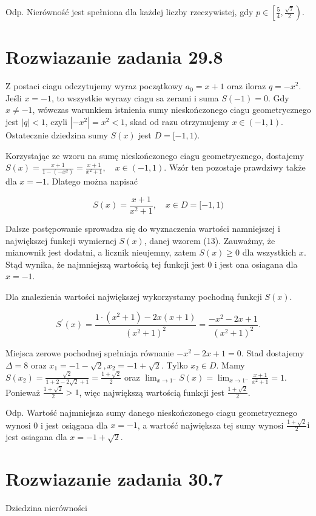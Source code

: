 \documentclass[10pt]{article}
\begin{document}
Odp. Nierówność jest spełniona dla każdej liczby rzeczywistej, gdy $p \in\left[\frac{5}{4}, \frac{\sqrt{7}}{2}\right)$.

\section*{Rozwiazanie zadania 29.8}
Z postaci ciagu odczytujemy wyraz początkowy $a_{0}=x+1$ oraz iloraz $q=-x^{2}$. Jeśli $x=-1$, to wszystkie wyrazy ciagu sa zerami i suma $S(-1)=0$. Gdy $x \neq-1$, wówczas warunkiem istnienia sumy nieskończonego ciagu geometrycznego jest $|q|<1$, czyli $\left|-x^{2}\right|=x^{2}<1$, skad od razu otrzymujemy $x \in(-1,1)$. Ostatecznie dziedzina sumy $S(x)$ jest $D=[-1,1)$.

Korzystając ze wzoru na sumę nieskończonego ciagu geometrycznego, dostajemy $S(x)=\frac{x+1}{1-\left(-x^{2}\right)}=\frac{x+1}{x^{2}+1}, \quad x \in(-1,1)$. Wzór ten pozostaje prawdziwy także dla $x=-1$. Dlatego można napisać

$$
S(x)=\frac{x+1}{x^{2}+1}, \quad x \in D=[-1,1)
$$

Dalsze postępowanie sprowadza się do wyznaczenia wartości namniejszej i największej funkcji wymiernej $S(x)$, danej wzorem (13). Zauważmy, że mianownik jest dodatni, a licznik nieujemny, zatem $S(x) \geq 0$ dla wszystkich $x$. Stąd wynika, że najmniejszą wartością tej funkcji jest 0 i jest ona osiagana dla $x=-1$.

Dla znalezienia wartości największej wykorzystamy pochodną funkcji $S(x)$.

$$
S^{\prime}(x)=\frac{1 \cdot\left(x^{2}+1\right)-2 x(x+1)}{\left(x^{2}+1\right)^{2}}=\frac{-x^{2}-2 x+1}{\left(x^{2}+1\right)^{2}} .
$$

Miejsca zerowe pochodnej spełniaja równanie $-x^{2}-2 x+1=0$. Stad dostajemy $\Delta=8$ oraz $x_{1}=-1-\sqrt{2}, x_{2}=-1+\sqrt{2}$. Tylko $x_{2} \in D$. Mamy $S\left(x_{2}\right)=\frac{\sqrt{2}}{1+2-2 \sqrt{2}+1}=\frac{1+\sqrt{2}}{2}$ oraz $\lim _{x \rightarrow 1^{-}} S(x)=\lim _{x \rightarrow 1^{-}} \frac{x+1}{x^{2}+1}=1$. Ponieważ $\frac{1+\sqrt{2}}{2}>1$, więc największą wartością funkcji jest $\frac{1+\sqrt{2}}{2}$.

Odp. Wartość najmniejsza sumy danego nieskończonego ciagu geometrycznego wynosi 0 i jest osiągana dla $x=-1$, a wartość największa tej sumy wynosi $\frac{1+\sqrt{2}}{2} \mathrm{i}$ jest osiagana dla $x=-1+\sqrt{2}$.

\section*{Rozwiazanie zadania 30.7}
Dziedzina nierówności
\end{document}
